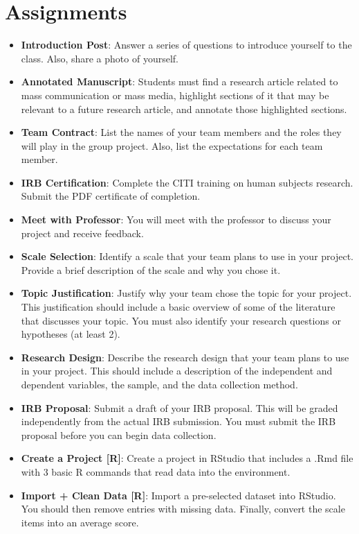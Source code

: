 \documentclass[
]{book}
\providecommand{\tightlist}{%
  \setlength{\itemsep}{0pt}\setlength{\parskip}{0pt}}
\begin{document}
\section{Assignments}\label{assignments}

\begin{itemize}
\tightlist
\item
  \textbf{Introduction Post}: Answer a series of questions to introduce yourself to the class. Also, share a photo of yourself.
\item
  \textbf{Annotated Manuscript}: Students must find a research article related to mass communication or mass media, highlight sections of it that may be relevant to a future research article, and annotate those highlighted sections.
\item
  \textbf{Team Contract}: List the names of your team members and the roles they will play in the group project. Also, list the expectations for each team member.
\item
  \textbf{IRB Certification}: Complete the CITI training on human subjects research. Submit the PDF certificate of completion.
\item
  \textbf{Meet with Professor}: You will meet with the professor to discuss your project and receive feedback.
\item
  \textbf{Scale Selection}: Identify a scale that your team plans to use in your project. Provide a brief description of the scale and why you chose it.
\item
  \textbf{Topic Justification}: Justify why your team chose the topic for your project. This justification should include a basic overview of some of the literature that discusses your topic. You must also identify your research questions or hypotheses (at least 2).
\item
  \textbf{Research Design}: Describe the research design that your team plans to use in your project. This should include a description of the independent and dependent variables, the sample, and the data collection method.
\item
  \textbf{IRB Proposal}: Submit a draft of your IRB proposal. This will be graded independently from the actual IRB submission. You must submit the IRB proposal before you can begin data collection.
\item
  \textbf{Create a Project {[}R{]}}: Create a project in RStudio that includes a .Rmd file with 3 basic R commands that read data into the environment.
\item
  \textbf{Import + Clean Data {[}R{]}}: Import a pre-selected dataset into RStudio. You should then remove entries with missing data. Finally, convert the scale items into an average score.

\end{itemize}
\end{document}
